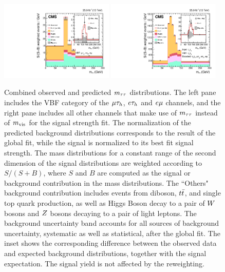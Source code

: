 \begin{figure}[htb]
  \centering
    \includegraphics[width=0.48\textwidth]{higgs_to_taus/plots/Figure_019-a.pdf}
    \includegraphics[width=0.48\textwidth]{higgs_to_taus/plots/Figure_019-b.pdf}
   \caption{Combined observed and predicted $m_{\tau\tau}$ distributions. The left pane includes the VBF category of the 
$\mu\tau_{h}$, $e\tau_{h}$ and $e\mu$ channels, and the right pane includes all other channels that make use 
of $m_{\tau\tau}$ instead of $m_\text{vis}$ for the signal strength fit. 
The normalization of the predicted background 
distributions corresponds to the result of the global fit, while the signal is normalized to its best fit 
signal strength. The mass distributions for a constant range of the second dimension of the signal distributions 
are weighted according to $S/(S+B)$, where $S$ and $B$ are computed as the signal or background 
contribution in the mass distributions. The ``Others" background contribution 
includes events from diboson, $t\bar{t}$, and single top quark production, as well as Higgs Boson decay to a pair 
of $W$ bosons and $Z$ bosons decaying to a pair of light leptons. The background uncertainty band accounts 
for all sources of background uncertainty, systematic as well as statistical, after the global fit. The inset 
shows the corresponding difference between the observed data and expected background distributions, together 
with the signal expectation. The signal yield is not affected by the reweighting.
}
\label{fig:htt_massweighted}
\end{figure}


